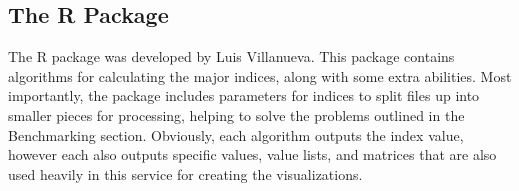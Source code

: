 \subsection{The  R Package}
The  R package was developed by Luis Villanueva. This package contains algorithms for calculating the major indices, along with some extra abilities. Most importantly, the  package includes parameters for indices to split files up into smaller pieces for processing, helping to solve the problems outlined in the Benchmarking section. Obviously, each algorithm outputs the index value, however each also outputs specific values, value lists, and matrices that are also used heavily in this service for creating the visualizations.








